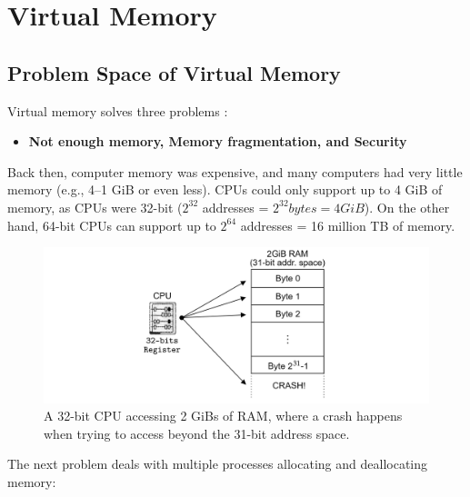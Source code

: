 \newpage
\section{Virtual Memory}

\label{sec:virt}
\subsection{Problem Space of Virtual Memory}
Virtual memory solves three problems \cite{virtualmemory2023}:
\begin{itemize}
    \item \textbf{Not enough memory, Memory fragmentation, and Security}
\end{itemize}
\begin{Def}

    Back then, computer memory was expensive, and many computers had very little memory (e.g., 4--1 GiB or even less).
    CPUs could only support up to 4 GiB of memory, as CPUs were 32-bit ($2^{32}$ addresses = $2^{32} bytes  = 4 GiB$). 
    On the other hand, 64-bit CPUs can support up to $2^{64}$ addresses = 16 million TB of memory.
\end{Def}

\begin{figure}[h]

    \hspace{-7em}
    \includegraphics[width=1.3\textwidth]{Sections/virt/crash.png}
    
    \vspace{1em}
    \caption{A 32-bit CPU accessing 2 GiBs of RAM, where a crash happens when trying to access beyond the 31-bit address space.}
    
    \label{fig:virt1}
\end{figure}
\newpage 

\noindent
The next problem deals with multiple processes allocating and deallocating memory:

